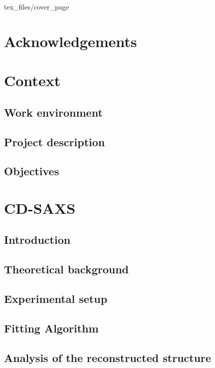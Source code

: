 \documentclass{article}
\begin{document}
 {tex_files/cover_page}

\newpage
\section*{Acknowledgements}

\medskip


\newpage

\tableofcontents





\section{Context}
\subsection{Work environment}
\subsection{Project description}
\subsection{Objectives}


\section{CD-SAXS}
\subsection{Introduction}
\subsection{Theoretical background}
\subsection{Experimental setup}
\subsection{Fitting Algorithm}
\subsection{Analysis of the reconstructed structure}
\end{document}
